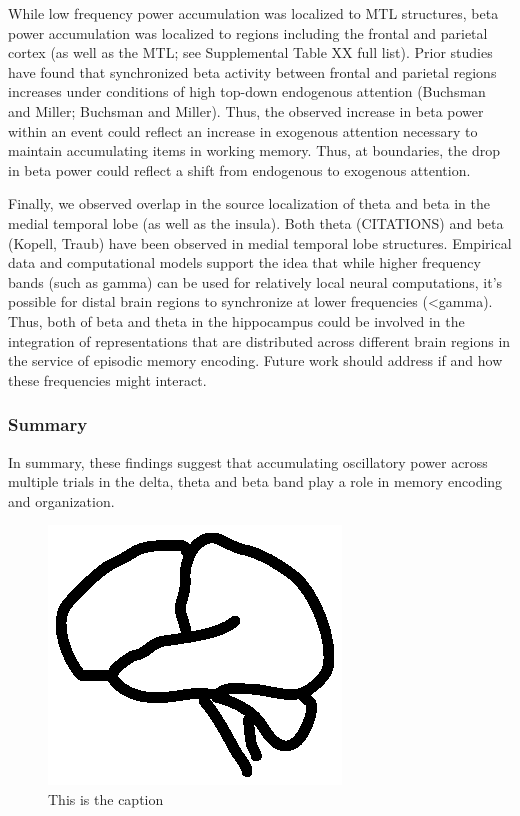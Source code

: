 While low frequency power accumulation was localized to MTL structures,
beta power accumulation was localized to regions including the frontal
and parietal cortex (as well as the MTL; see Supplemental Table XX full
list). Prior studies have found that synchronized beta activity between
frontal and parietal regions increases under conditions of high top-down
endogenous attention (Buchsman and Miller; Buchsman and Miller). Thus,
the observed increase in beta power within an event could reflect an
increase in exogenous attention necessary to maintain accumulating items
in working memory. Thus, at boundaries, the drop in beta power could
reflect a shift from endogenous to exogenous attention.

Finally, we observed overlap in the source localization of theta and
beta in the medial temporal lobe (as well as the insula). Both theta
(CITATIONS) and beta (Kopell, Traub) have been observed in medial
temporal lobe structures. Empirical data and computational models
support the idea that while higher frequency bands (such as gamma) can
be used for relatively local neural computations, it's possible for
distal brain regions to synchronize at lower frequencies
(\textless{}gamma). Thus, both of beta and theta in the hippocampus
could be involved in the integration of representations that are
distributed across different brain regions in the service of episodic
memory encoding. Future work should address if and how these frequencies
might interact.

\subsubsection{Summary}\label{summary}

In summary, these findings suggest that accumulating oscillatory power
across multiple trials in the delta, theta and beta band play a role in
memory encoding and organization.

\begin{figure}[htbp]
\centering
\includegraphics{figures/figure1}
\caption{This is the caption}
\end{figure}
